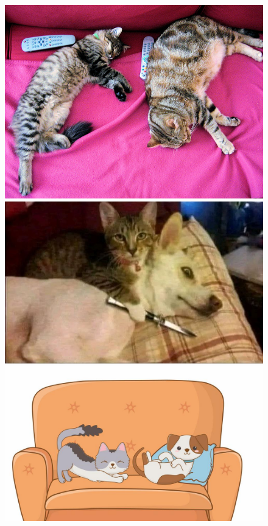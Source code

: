 \begin{figure}
\centering
\begin{minipage}{0.3\textwidth}
 \includegraphics[width=\textwidth]{Graphics/Images/image_1.jpg}
 \caption{ }
 \label{fig:1}
\end{minipage}%
\begin{minipage}{0.3\textwidth}
 \includegraphics[width=\textwidth]{Graphics/Images/image_2.jpg}
 \caption{ }
 \label{fig:2}
\end{minipage}
\begin{minipage}{0.3\textwidth}
 \includegraphics[width=\textwidth]{Graphics/Images/image_3.jpg}
 \caption{ }
 \label{fig:3}
\end{minipage}
\end{figure}

